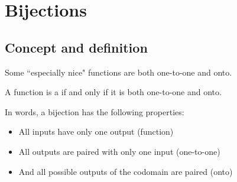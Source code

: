  
 
\section{Bijections}

\subsection{Concept and definition}

\medskip\noindent
Some ``especially nice" functions are both one-to-one and onto.

\begin{defn}
 A function is a  if and only if it is both one-to-one and onto.
\end{defn}

In words, a bijection has the following properties:
\begin{itemize}
\item
All inputs have only one output (function)
\item
All outputs are paired with only one input (one-to-one)
\item
And all possible outputs of the codomain are paired (onto)
\end{itemize}


